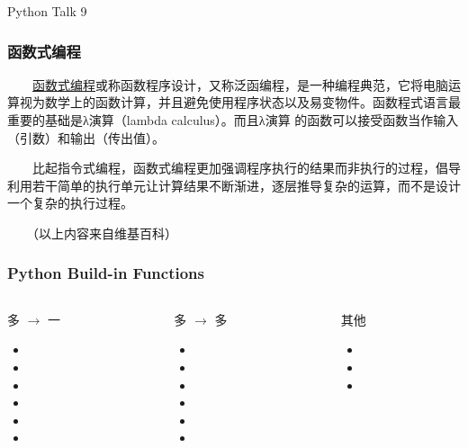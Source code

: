 



\PreFirstFrame
\begin{frame} [fragile]
	\centerline{\fontsize{42}{42}\selectfont Python Talk 9}
\end{frame}
\PostFirstFrame

\begin{frame} [fragile]
	\frametitle{函数式编程}
	　　\href{https://zh.wikipedia.org/wiki/\%E5\%87\%BD\%E6\%95\%B0\%E5\%BC\%8F\%E7\%BC\%96\%E7\%A8\%8B}{函数式编程}或称函数程序设计，又称泛函编程，是一种编程典范，它将电脑运算视为数学上的函数计算，并且避免使用程序状态以及易变物件。函数程式语言最重要的基础是λ演算（lambda calculus）。而且λ演算     的函数可以接受函数当作输入（引数）和输出（传出值）。

	　　比起指令式编程，函数式编程更加强调程序执行的结果而非执行的过程，倡导利用若干简单的执行单元让计算结果不断渐进，逐层推导复杂的运算，而不是设计一个复杂的执行过程。

	　　（以上内容来自维基百科）
\end{frame}

\begin{frame} [fragile]
	\frametitle{Python Build-in Functions}
	\linespread{1.5}
	\begin{columns}[T]
		\begin{column}[T]{.333333\textwidth}
			多 $\to$ 一
			\begin{itemize}
				\item {}
				\item {}
				\item {}
				\item {}
				\item {}
				\item {}
			\end{itemize}
		\end{column}
		\begin{column}[T]{.333333\textwidth}
			多 $\to$ 多
			\begin{itemize}
				\item {}
				\item {}
				\item {}
				\item {}
				\item {}
				\item {}
			\end{itemize}
		\end{column}
		\begin{column}[T]{.333333\textwidth}
			其他
			\begin{itemize}
				\item {}
				\item {}
				\item {}
			\end{itemize}
		\end{column}
	\end{columns}
\end{frame}


